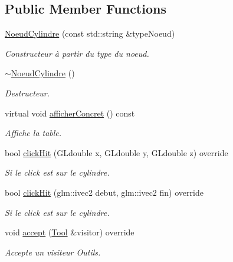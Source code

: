 \subsection*{Public Member Functions}
{\bf }\par
\begin{DoxyCompactItemize}
\item 
\hyperlink{class_noeud_cylindre_aee7f35b6d758ac40b96daadf526f4504}{Noeud\+Cylindre} (const std\+::string \&type\+Noeud)
\begin{DoxyCompactList}\small\item\em Constructeur à partir du type du noeud. \end{DoxyCompactList}\item 
\hyperlink{class_noeud_cylindre_aa08fe15b1f926c8d651fcd467d3cb36a}{$\sim$\+Noeud\+Cylindre} ()
\begin{DoxyCompactList}\small\item\em Destructeur. \end{DoxyCompactList}\item 
virtual void \hyperlink{class_noeud_cylindre_a24bd5b287091cdecdd250ebb83594551}{afficher\+Concret} () const 
\begin{DoxyCompactList}\small\item\em Affiche la table. \end{DoxyCompactList}\item 
bool \hyperlink{class_noeud_cylindre_a6dd083ca619c9ff7977d3a0878732519}{click\+Hit} (G\+Ldouble x, G\+Ldouble y, G\+Ldouble z) override
\begin{DoxyCompactList}\small\item\em Si le click est sur le cylindre. \end{DoxyCompactList}\item 
bool \hyperlink{class_noeud_cylindre_a461dfbf53728711e290d14db7464f5f9}{click\+Hit} (glm\+::ivec2 debut, glm\+::ivec2 fin) override
\begin{DoxyCompactList}\small\item\em Si le click est sur le cylindre. \end{DoxyCompactList}\item 
\hypertarget{class_noeud_cylindre_a108b067e7817f5c83ca66643bb67769b}{}void \hyperlink{class_noeud_cylindre_a108b067e7817f5c83ca66643bb67769b}{accept} (\hyperlink{class_tool}{Tool} \&visitor) override\label{class_noeud_cylindre_a108b067e7817f5c83ca66643bb67769b}

\begin{DoxyCompactList}\small\item\em Accepte un visiteur Outils. \end{DoxyCompactList}\end{DoxyCompactItemize}

